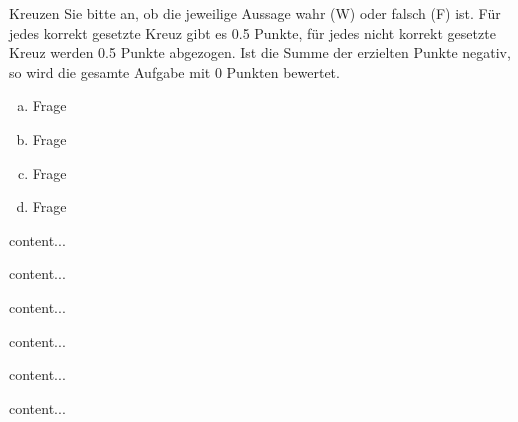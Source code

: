 \documentclass[12pt]{article}
\begin{document}
\begin{aufgabe}[8 Punkte]
    Kreuzen Sie bitte an, ob die jeweilige Aussage wahr (W) oder falsch (F) ist. F\"ur jedes
    korrekt gesetzte Kreuz gibt es 0.5 Punkte, f\"ur jedes nicht korrekt gesetzte Kreuz werden 0.5 Punkte
    abgezogen. Ist die Summe der erzielten Punkte negativ, so wird die gesamte Aufgabe mit
    0 Punkten bewertet.
    \begin{enumerate}[a)]
        \item Frage
        
        \begin{ankreuzblock}
        \end{ankreuzblock}
        \item Frage
        
        \begin{ankreuzblock}
        \end{ankreuzblock}
        \item Frage
        
        \begin{ankreuzblock}
        \end{ankreuzblock}
        \item Frage
        
        \begin{ankreuzblock}
        \end{ankreuzblock}
    \end{enumerate}
\end{aufgabe}
%
%
%
%
\newpage
%
\begin{aufgabe}[11 Punkte]
    content...
\end{aufgabe}
%
\begin{loesung}
    content...
\end{loesung}
%
%
%
%
\begin{aufgabe}[11 Punkte]
    content...
\end{aufgabe}
%
\begin{loesung}
    content...
\end{loesung}
%
%
%
%
\begin{aufgabe}[12 Punkte]
    content...
\end{aufgabe}
%
\begin{loesung}
    content...
\end{loesung}
%
%
%
%
\end{document}
